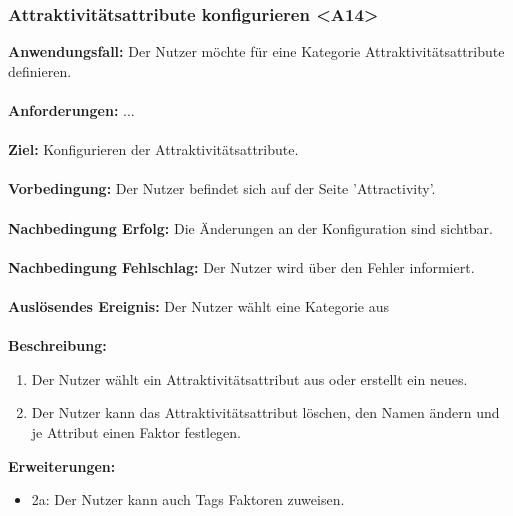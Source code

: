 \documentclass[parskip=full]{scrartcl} %
\begin{document}
\subsubsection*{Attraktivitätsattribute konfigurieren <A14>}
\textbf{Anwendungsfall:} Der Nutzer möchte für eine Kategorie Attraktivitätsattribute definieren.\\\\
\textbf{Anforderungen:} ...\\\\
\textbf{Ziel:} Konfigurieren der Attraktivitätsattribute. \\\\
\textbf{Vorbedingung:} Der Nutzer befindet sich auf der Seite 'Attractivity'. \\\\
\textbf{Nachbedingung Erfolg:} Die Änderungen an der Konfiguration sind sichtbar. \\\\
\textbf{Nachbedingung Fehlschlag:} Der Nutzer wird über den Fehler informiert. \\\\
\textbf{Auslösendes Ereignis:} Der Nutzer wählt eine Kategorie aus \\\\
\textbf{Beschreibung:}
\begin{enumerate}
    \item Der Nutzer wählt ein Attraktivitätsattribut aus oder erstellt ein neues.
    \item Der Nutzer kann das Attraktivitätsattribut löschen, den Namen ändern und je Attribut einen Faktor festlegen.
\end{enumerate}
\textbf{Erweiterungen:} 
\begin{itemize}
    \item 2a: Der Nutzer kann auch Tags Faktoren zuweisen.
\end{itemize}
\newpage
\end{document}
